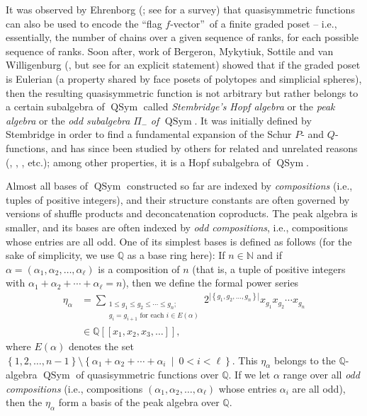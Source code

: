 \documentclass[numbers=enddot,12pt,final,onecolumn,notitlepage]{scrartcl}%
\theoremstyle{definition}
\let\sumnonlimits\sum
\renewcommand{\sum}{\sumnonlimits\limits}
\begin{document}
It was observed by Ehrenborg (\cite[Lemma 4.2]{Ehrenb96}; see \cite[\S 3.3]%
{Biller10} for a survey) that quasisymmetric functions can also be used to
encode the \textquotedblleft flag $f$-vector\textquotedblright\ of a finite
graded poset -- i.e., essentially, the number of chains over a given sequence
of ranks, for each possible sequence of ranks. Soon after, work of Bergeron,
Mykytiuk, Sottile and van Willigenburg (\cite[Example 5.3]{BMSW00}, but see
\cite[\S 3.4]{Biller10} for an explicit statement) showed that if the graded
poset is Eulerian (a property shared by face posets of polytopes and
simplicial spheres), then the resulting quasisymmetric function is not
arbitrary but rather belongs to a certain subalgebra of $\operatorname*{QSym}$
called \textit{Stembridge's Hopf algebra} or the \textit{peak algebra} or the
\textit{odd subalgebra }$\Pi_{-}$ \textit{of }$\operatorname*{QSym}$. It was
initially defined by Stembridge \cite[\S 3]{Stembr97} in order to find a
fundamental expansion of the Schur $P$- and $Q$-functions, and has since been
studied by others for related and unrelated reasons (\cite[\S 6, particularly
Proposition 6.5]{AgBeSo14}, \cite{BMSW99}, \cite[\S 5]{BMSW00}, \cite{Hsiao07}
etc.); among other properties, it is a Hopf subalgebra of
$\operatorname*{QSym}$.

Almost all bases of $\operatorname*{QSym}$ constructed so far are indexed by
\textit{compositions} (i.e., tuples of positive integers), and their structure
constants are often governed by versions of shuffle products and
deconcatenation coproducts. The peak algebra is smaller, and its bases are
often indexed by \textit{odd compositions}, i.e., compositions whose entries
are all odd. One of its simplest bases is defined as follows (for the sake of
simplicity, we use $\mathbb{Q}$ as a base ring here): If $n\in\mathbb{N}$ and
if $\alpha=\left(  \alpha_{1},\alpha_{2},\ldots,\alpha_{\ell}\right)  $ is a
composition of $n$ (that is, a tuple of positive integers with $\alpha
_{1}+\alpha_{2}+\cdots+\alpha_{\ell}=n$), then we define the formal power
series%
\begin{align}
\eta_{\alpha}  &  =\sum_{\substack{1\leq g_{1}\leq g_{2}\leq\cdots\leq
g_{n};\\g_{i}=g_{i+1}\text{ for each }i\in E\left(  \alpha\right)
}}2^{\left\vert \left\{  g_{1},g_{2},\ldots,g_{n}\right\}  \right\vert
}x_{g_{1}}x_{g_{2}}\cdots x_{g_{n}}\label{eq.intro.eta=}\\
&  \in\mathbb{Q}\left[  \left[  x_{1},x_{2},x_{3},\ldots\right]  \right]
,\nonumber
\end{align}
where $E\left(  \alpha\right)  $ denotes the set $\left\{  1,2,\ldots
,n-1\right\}  \setminus\left\{  \alpha_{1}+\alpha_{2}+\cdots+\alpha_{i}%
\ \mid\ 0<i<\ell\right\}  $. This $\eta_{\alpha}$ belongs to the $\mathbb{Q}%
$-algebra $\operatorname*{QSym}$ of quasisymmetric functions over $\mathbb{Q}%
$. If we let $\alpha$ range over all \textit{odd compositions} (i.e.,
compositions $\left(  \alpha_{1},\alpha_{2},\ldots,\alpha_{\ell}\right)  $
whose entries $\alpha_{i}$ are all odd), then the $\eta_{\alpha}$ form a basis
of the peak algebra over $\mathbb{Q}$.
\end{document}
